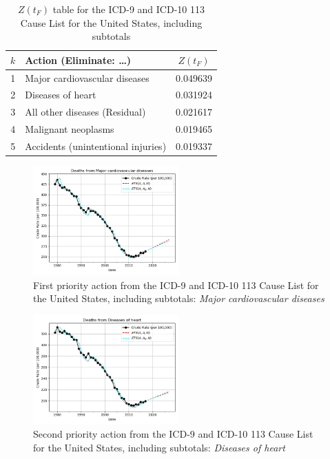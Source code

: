 \documentclass[10pt, a4paper, twocolumn]{IEEEconf}
\begin{document}
\begin{table}[H]
  \centering
  \begin{tabular}{clc}
    \toprule
      $k$ & Action (Eliminate: \ldots) & $Z(t_F)$ \\
    \midrule
      1 &      Major cardiovascular diseases & 0.049639 \\
      2 &                  Diseases of heart & 0.031924 \\
      3 &      All other diseases (Residual) & 0.021617 \\
      4 &                Malignant neoplasms & 0.019465 \\
      5 & Accidents (unintentional injuries) & 0.019337 \\
  \end{tabular}
  \caption{$Z(t_F)$ table for the ICD-9 and ICD-10 113 Cause List for the United States, including subtotals}
  \label{table:ztable2}
\end{table}

\begin{figure}[H]
  \centering
  \includegraphics[width=0.5\textwidth]{results/US_ICD_113_SELECTED_CAUSES_ALL/Major_cardiovascular_diseases_ets.png}
  \caption{First priority action from the ICD-9 and ICD-10 113 Cause List for the United States, including subtotals: \textit{Major cardiovascular diseases}}\label{fig:k3a}
\end{figure}

\begin{figure}[H]
  \centering
  \includegraphics[width=0.5\textwidth]{results/US_ICD_113_SELECTED_CAUSES_ALL/Diseases_of_heart_ets.png}
  \caption{Second priority action from the ICD-9 and ICD-10 113 Cause List for the United States, including subtotals: \textit{Diseases of heart}}\label{fig:k3b}
\end{figure}
\end{document}
